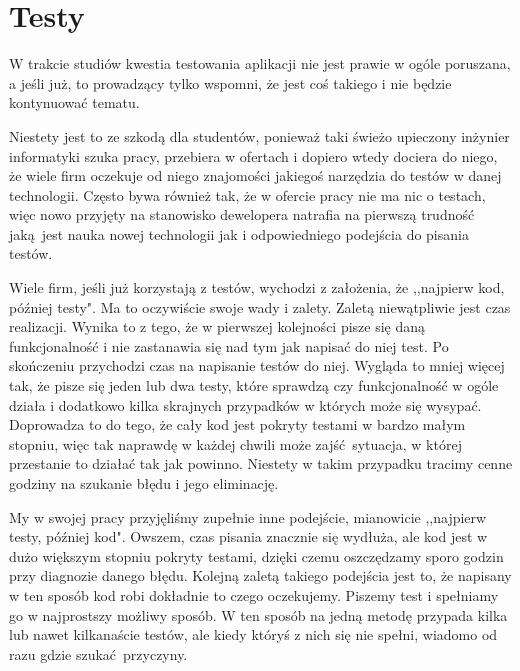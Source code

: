 \section{Testy}
	\label{testy}
	W trakcie studiów kwestia testowania aplikacji nie jest prawie w ogóle poruszana, a jeśli już, to prowadzący tylko wspomni, że jest coś takiego i nie będzie kontynuować tematu.

	Niestety jest to ze szkodą dla studentów, ponieważ taki świeżo upieczony inżynier informatyki szuka pracy, przebiera w ofertach i dopiero wtedy dociera do niego, że wiele firm oczekuje od niego znajomości jakiegoś narzędzia do testów w danej technologii. Często bywa również tak, że w ofercie pracy nie ma nic o testach, więc nowo przyjęty na stanowisko dewelopera natrafia na pierwszą trudność jaką jest nauka nowej technologii jak i odpowiedniego podejścia do pisania testów.

	Wiele firm, jeśli już korzystają z testów, wychodzi z założenia, że ,,najpierw kod, później testy". Ma to oczywiście swoje wady i zalety. Zaletą niewątpliwie jest czas realizacji. Wynika to z tego, że w pierwszej kolejności pisze się daną funkcjonalność i nie zastanawia się nad tym jak napisać do niej test. Po skończeniu przychodzi czas na napisanie testów do niej. Wygląda to mniej więcej tak, że pisze się jeden lub dwa testy, które sprawdzą czy funkcjonalność w ogóle działa i dodatkowo kilka skrajnych przypadków w których może się wysypać. Doprowadza to do tego, że cały kod jest pokryty testami w bardzo małym stopniu, więc tak naprawdę w każdej chwili może zajść sytuacja, w której przestanie to działać tak jak powinno. Niestety w takim przypadku tracimy cenne godziny na szukanie błędu i jego eliminację.

	My w swojej pracy przyjęliśmy zupełnie inne podejście, mianowicie ,,najpierw testy, później kod". Owszem, czas pisania znacznie się wydłuża, ale kod jest w dużo większym stopniu pokryty testami, dzięki czemu oszczędzamy sporo godzin przy diagnozie danego błędu. Kolejną zaletą takiego podejścia jest to, że napisany w ten sposób kod robi dokładnie to czego oczekujemy. Piszemy test i spełniamy go w najprostszy możliwy sposób. W ten sposób na jedną metodę przypada kilka lub nawet kilkanaście testów, ale kiedy któryś z nich się nie spełni, wiadomo od razu gdzie szukać przyczyny.

